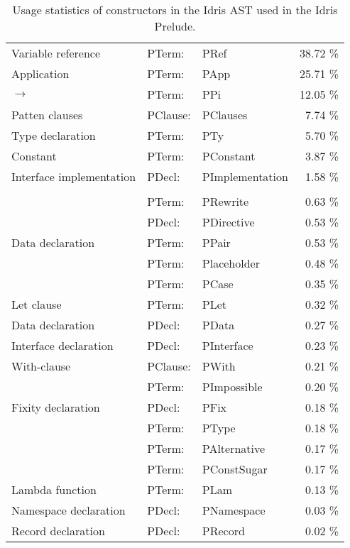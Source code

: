 \documentclass[parskip=half]{scrartcl}
\begin{document}
\begin{table}[h]
  \caption {Usage statistics of constructors in the Idris AST used in the Idris
  Prelude.}
  \label{tbl:stats}
\begin{center}
  \begin{tabular}{ l l l r }
    Variable reference       & PTerm:   &    PRef            &    38.72 \% \\
    Application              & PTerm:   &    PApp            &    25.71 \% \\
    $\rightarrow$            & PTerm:   &    PPi             &    12.05 \% \\
    Patten clauses           & PClause: &    PClauses        &    7.74  \% \\
    Type declaration         & PTerm:   &    PTy             &    5.70  \% \\
    Constant                 & PTerm:   &    PConstant       &    3.87  \% \\
    Interface implementation & PDecl:   &    PImplementation &    1.58  \% \\
    \\
                             & PTerm:   &    PRewrite        &    0.63  \% \\
                             & PDecl:   &    PDirective      &    0.53  \% \\
    Data declaration         & PTerm:   &    PPair           &    0.53  \% \\
                             & PTerm:   &    Placeholder     &    0.48  \% \\
                             & PTerm:   &    PCase           &    0.35  \% \\
    Let clause               & PTerm:   &    PLet            &    0.32  \% \\
    Data declaration         & PDecl:   &    PData           &    0.27  \% \\
    Interface declaration    & PDecl:   &    PInterface      &    0.23  \% \\
    With-clause              & PClause: &    PWith           &    0.21  \% \\
                             & PTerm:   &    PImpossible     &    0.20  \% \\
    Fixity declaration       & PDecl:   &    PFix            &    0.18  \% \\
                             & PTerm:   &    PType           &    0.18  \% \\
                             & PTerm:   &    PAlternative    &    0.17  \% \\
                             & PTerm:   &    PConstSugar     &    0.17  \% \\
    Lambda function          & PTerm:   &    PLam            &    0.13  \% \\
    Namespace declaration    & PDecl:   &    PNamespace      &    0.03  \% \\
    Record declaration       & PDecl:   &    PRecord         &    0.02  \% \\


\end{tabular}
\end{center}
\end{table}
\end{document}
